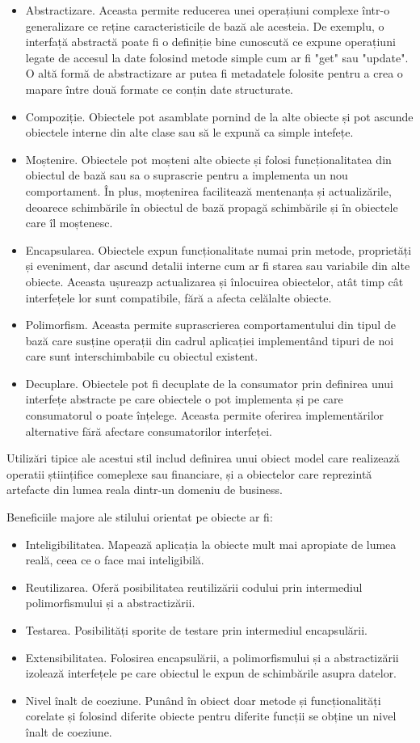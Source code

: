 \documentclass[12pt, a4paper, oneside, romanian]{teza-upb}
\begin{document}
\begin{itemize}
 \item Abstractizare. Aceasta permite reducerea unei operațiuni complexe într-o generalizare ce reține caracteristicile de bază ale acesteia. De exemplu, o interfață abstractă poate fi o definiție bine cunoscută ce expune operațiuni legate de accesul la date folosind metode simple cum ar fi "get" sau "update". O altă formă de abstractizare ar putea fi metadatele folosite pentru a crea o mapare între două formate ce conțin date structurate.
 \item Compoziție. Obiectele pot asamblate pornind de la alte obiecte și pot ascunde obiectele interne din alte clase sau să le expună ca simple intefețe.
 \item Moștenire. Obiectele pot moșteni alte obiecte și folosi funcționalitatea din obiectul de bază sau sa o suprascrie pentru a implementa un nou comportament. În plus, moștenirea facilitează mentenanța și actualizările, deoarece schimbările în obiectul de bază propagă schimbările și în obiectele care îl moștenesc.
 \item Encapsularea. Obiectele expun funcționalitate numai prin metode, proprietăți și eveniment, dar ascund detalii interne cum ar fi starea sau variabile din alte obiecte. Aceasta ușureazp actualizarea și înlocuirea obiectelor, atât timp cât interfețele lor sunt compatibile, fără a afecta celălalte obiecte.
 \item Polimorfism. Aceasta permite suprascrierea comportamentului din tipul de bază care susține operații din cadrul aplicației implementând tipuri de noi care sunt interschimbabile cu obiectul existent.
 \item Decuplare. Obiectele pot fi decuplate de la consumator prin definirea unui interfețe abstracte pe care obiectele o pot implementa și pe care consumatorul o poate înțelege. Aceasta permite oferirea implementărilor alternative fără afectare consumatorilor interfeței.
\end{itemize}
Utilizări tipice ale acestui stil includ definirea unui obiect model care realizează operatii științifice comeplexe sau financiare, și a obiectelor care reprezintă artefacte din lumea reala dintr-un domeniu de business.

Beneficiile majore ale stilului orientat pe obiecte ar fi:
\begin{itemize}
 \item Inteligibilitatea. Mapează aplicația la obiecte mult mai apropiate de lumea reală, ceea ce o face mai inteligibilă.
 \item Reutilizarea. Oferă posibilitatea reutilizării codului prin intermediul polimorfismului și a abstractizării.
 \item Testarea. Posibilități sporite de testare prin intermediul encapsulării.
 \item Extensibilitatea. Folosirea encapsulării, a polimorfismului și a abstractizării izolează interfețele pe care obiectul le expun de schimbările asupra datelor.
 \item Nivel înalt de coeziune. Punând în obiect doar metode și funcționalități corelate și folosind diferite obiecte pentru diferite funcții se obține un nivel înalt de coeziune.
\end{itemize}
\end{document}
